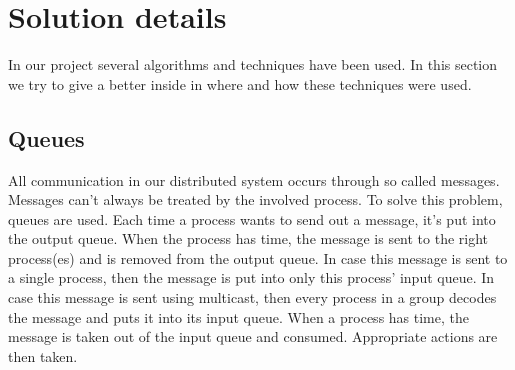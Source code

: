 \documentclass[10pt]{article} %
\begin{document}
\section{Solution details}
In our project several algorithms and techniques have been used. In this section we try to give a better inside in where and how these techniques were used.
\subsection{Queues}
All communication in our distributed system occurs through so called messages. Messages can't always be treated by the involved process. To solve this problem, queues are used. Each time a process wants to send out a message, it's put into the output queue. When the process has time, the message is sent to the right process(es) and is removed from the output queue. In case this message is sent to a single process, then the message is put into only this process' input queue. In case this message is sent using multicast, then every process in a group decodes the message and puts it into its input queue. When a process has time, the message is taken out of the input queue and consumed. Appropriate actions are then taken.
\end{document}
